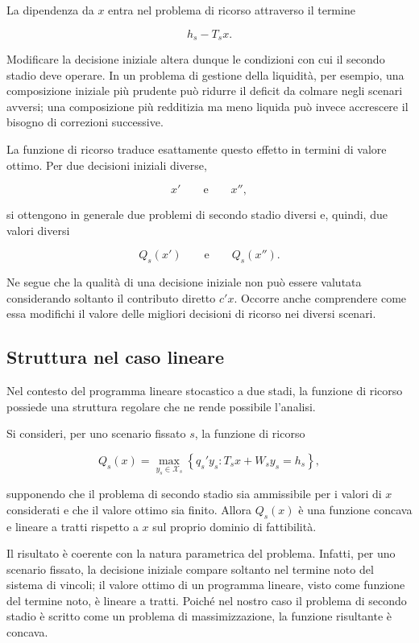La dipendenza da $x$ entra nel problema di ricorso attraverso il termine

\[
h_s-T_sx.
\]

Modificare la decisione iniziale altera dunque le condizioni con cui il
secondo stadio deve operare. In un problema di gestione della liquidit\`a,
per esempio, una composizione iniziale pi\`u prudente pu\`o ridurre il deficit
da colmare negli scenari avversi; una composizione pi\`u redditizia ma meno
liquida pu\`o invece accrescere il bisogno di correzioni successive.

La funzione di ricorso traduce esattamente questo effetto in termini di
valore ottimo. Per due decisioni iniziali diverse,

\[
x'
\qquad\text{e}\qquad
x'',
\]

si ottengono in generale due problemi di secondo stadio diversi e, quindi,
due valori diversi

\[
Q_s(x')
\qquad\text{e}\qquad
Q_s(x'').
\]

Ne segue che la qualit\`a di una decisione iniziale non pu\`o essere valutata
considerando soltanto il contributo diretto $c'x$. Occorre anche comprendere
come essa modifichi il valore delle migliori decisioni di ricorso nei diversi
scenari.

\subsection{Struttura nel caso lineare}

Nel contesto del programma lineare stocastico a due stadi, la funzione di
ricorso possiede una struttura regolare che ne rende possibile l'analisi.

\begin{proposition}
Si consideri, per uno scenario fissato $s$, la funzione di ricorso

\[
Q_s(x)
=
\max_{y_s\in\mathcal X_s}
\left\{
q_s'y_s:
T_sx+W_sy_s=h_s
\right\},
\]

supponendo che il problema di secondo stadio sia ammissibile per i valori di
$x$ considerati e che il valore ottimo sia finito. Allora $Q_s(x)$ \`e una
funzione concava e lineare a tratti rispetto a $x$ sul proprio dominio di
fattibilit\`a.
\end{proposition}

Il risultato \`e coerente con la natura parametrica del problema. Infatti, per
uno scenario fissato, la decisione iniziale compare soltanto nel termine noto
del sistema di vincoli; il valore ottimo di un programma lineare, visto come
funzione del termine noto, \`e lineare a tratti. Poich\'e nel nostro caso il
problema di secondo stadio \`e scritto come un problema di massimizzazione, la
funzione risultante \`e concava.

